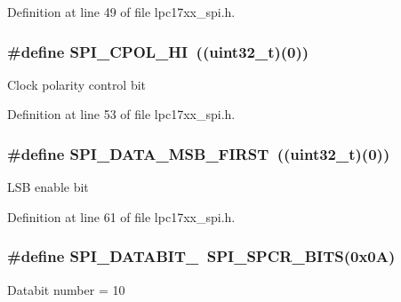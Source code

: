 \-Definition at line 49 of file lpc17xx\-\_\-spi.\-h.

\hypertarget{group___s_p_i___public___macros_gacceaa0635df4917c6300093ed8d85ee4}{
\subsubsection[{\-S\-P\-I\-\_\-\-C\-P\-O\-L\-\_\-\-H\-I}]{\setlength{\rightskip}{0pt plus 5cm}\#define {\bf \-S\-P\-I\-\_\-\-C\-P\-O\-L\-\_\-\-H\-I}~((uint32\-\_\-t)(0))}}\label{group___s_p_i___public___macros_gacceaa0635df4917c6300093ed8d85ee4}
\-Clock polarity control bit 

\-Definition at line 53 of file lpc17xx\-\_\-spi.\-h.

\hypertarget{group___s_p_i___public___macros_gaa86b44b85ddf5f62645839fa4871d93f}{
\subsubsection[{\-S\-P\-I\-\_\-\-D\-A\-T\-A\-\_\-\-M\-S\-B\-\_\-\-F\-I\-R\-S\-T}]{\setlength{\rightskip}{0pt plus 5cm}\#define {\bf \-S\-P\-I\-\_\-\-D\-A\-T\-A\-\_\-\-M\-S\-B\-\_\-\-F\-I\-R\-S\-T}~((uint32\-\_\-t)(0))}}\label{group___s_p_i___public___macros_gaa86b44b85ddf5f62645839fa4871d93f}
\-L\-S\-B enable bit 

\-Definition at line 61 of file lpc17xx\-\_\-spi.\-h.

\hypertarget{group___s_p_i___public___macros_ga22756cc85a8e6acd1c371597a3a4c3fb}{
\subsubsection[{\-S\-P\-I\-\_\-\-D\-A\-T\-A\-B\-I\-T\-\_\-10}]{\setlength{\rightskip}{0pt plus 5cm}\#define {\bf \-S\-P\-I\-\_\-\-D\-A\-T\-A\-B\-I\-T\-\_}~{\bf \-S\-P\-I\-\_\-\-S\-P\-C\-R\-\_\-\-B\-I\-T\-S}(0x0\-A)}}\label{group___s_p_i___public___macros_ga22756cc85a8e6acd1c371597a3a4c3fb}
\-Databit number = 10 


